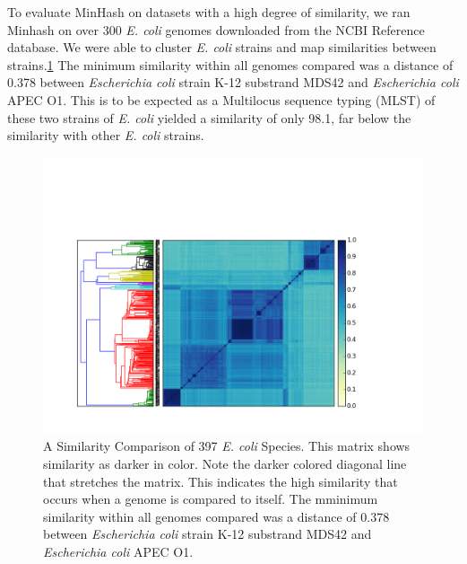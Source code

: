 \documentclass[12pt, letterpaper]{article}
\begin{document}
To evaluate MinHash on datasets with a high degree of similarity, we ran Minhash on over 300 \textit{E. coli} genomes downloaded from the NCBI Reference database. We were able to cluster \textit{E. coli} strains and map similarities between strains.\ref{fig:All Ecoli} The minimum similarity within all genomes compared was a distance of 0.378 between \textit{Escherichia coli} strain K-12 substrand MDS42 and \textit{Escherichia coli} APEC O1. This is to be expected as a Multilocus sequence typing (MLST) of these two strains of \textit{E. coli} yielded a similarity of only 98.1, far below the similarity with other \textit{E. coli} strains.\cite{E coli}

\FloatBarrier
\begin{figure}[h]
    \centering
    \includegraphics[width=1.0\textwidth]{All_E_coli}
    \caption{A Similarity Comparison of 397 \textit{E. coli} Species. This matrix shows similarity as darker in color. Note the darker colored diagonal line that stretches the matrix. This indicates the high similarity that occurs when a genome is compared to itself. The mminimum similarity within all genomes compared was a distance of 0.378 between \textit{Escherichia coli} strain K-12 substrand MDS42 and \textit{Escherichia coli} APEC O1.}
    \label{fig:All Ecoli}
\end{figure}
\FloatBarrier
\end{document}
